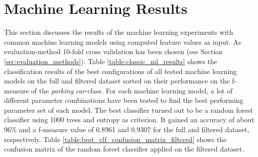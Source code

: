 \section{Machine Learning Results}
\label{sec:machine_learning_results}

This section discusses the results of the machine learning experiments with common machine learning models using computed feature values as input. As evaluation-method 10-fold cross validation has been chosen (see Section \ref{sec:evaluation_methods}). 
Table \ref{table:classic_ml_results} shows the classification results of the best configurations of all tested machine learning models on the full and filtered dataset sorted on their performance on the f-measure of the \emph{parking car}-class. For each machine learning model, a lot of different parameter combinations have been tested to find the best performing parameter set of each model. The best classifier turned out to be a random forest classifier using 1000 trees and entropy as criterion. It gained an accuracy of about 96\% and a f-measure value of 0.8961 and 0.9307 for the full and filtered dataset, respectively. Table \ref{table:best_clf_confusion_matrix_filtered} shows the confusion matrix of the random forest classifier applied on the filtered dataset. 


